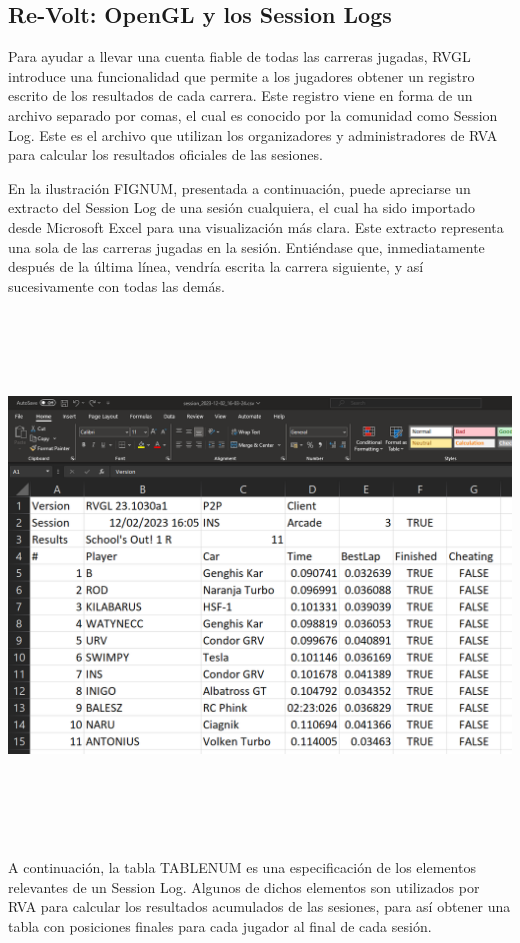 \subsection{Re-Volt: OpenGL y los Session Logs}

Para ayudar a llevar una cuenta fiable de todas las carreras jugadas, RVGL introduce una funcionalidad que permite a los jugadores obtener un registro escrito de los resultados de cada carrera. Este registro viene en forma de un archivo separado por comas, el cual es conocido por la comunidad como Session Log. Este es el archivo que utilizan los organizadores y administradores de RVA para calcular los resultados oficiales de las sesiones.

En la ilustración FIGNUM, presentada a continuación, puede apreciarse un extracto del Session Log de una sesión cualquiera, el cual ha sido importado desde Microsoft Excel para una visualización más clara. Este extracto representa una sola de las carreras jugadas en la sesión. Entiéndase que, inmediatamente después de la última línea, vendría escrita la carrera siguiente, y así sucesivamente con todas las demás.

\includegraphics[width=16cm, height=14cm]{img/raw-results.png}

A continuación, la tabla TABLENUM es una especificación de los elementos relevantes de un Session Log. Algunos de dichos elementos son utilizados por RVA para calcular los resultados acumulados de las sesiones, para así obtener una tabla con posiciones finales para cada jugador al final de cada sesión.

